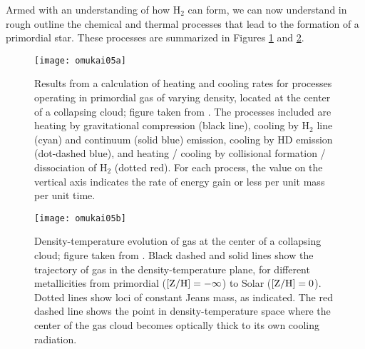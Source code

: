 Armed with an understanding of how H$_2$ can form, we can now understand in rough outline the chemical and thermal processes that lead to the formation of a primordial star. These processes are summarized in Figures \ref{fig:omukai05a} and \ref{fig:omukai05b}.

\begin{figure}
\texttt{[image: omukai05a]}
\caption[Heating and cooling processes in primordial gas]{
\label{fig:omukai05a}
Results from a calculation of heating and cooling rates for processes operating in primordial gas of varying density, located at the center of a collapsing cloud; figure taken from \citet{omukai05a}. The processes included are heating by gravitational compression (black line), cooling by H$_2$ line (cyan) and continuum (solid blue) emission, cooling by HD emission (dot-dashed blue), and heating / cooling by collisional formation / dissociation of H$_2$ (dotted red). For each process, the value on the vertical axis indicates the rate of energy gain or less per unit mass per unit time.
}
\end{figure}

\begin{figure}
\texttt{[image: omukai05b]}
\caption[Density-temperature evolution in primordial gas]{
\label{fig:omukai05b}
Density-temperature evolution of gas at the center of a collapsing cloud; figure taken from \citet{omukai05a}. Black dashed and solid lines show the trajectory of gas in the density-temperature plane, for different metallicities from primordial ($[{\rm Z}/{\rm H}] = -\infty$) to Solar ($[{\rm Z}/{\rm H}] = 0$). Dotted lines show loci of constant Jeans mass, as indicated. The red dashed line shows the point in density-temperature space where the center of the gas cloud becomes optically thick to its own cooling radiation.
}
\end{figure}

